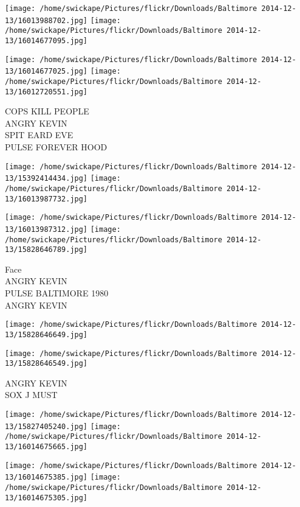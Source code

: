 \documentclass[10pt,letterpaper]{article}
\begin{document}
\texttt{[image: /home/swickape/Pictures/flickr/Downloads/Baltimore 2014-12-13/16013988702.jpg]}
\texttt{[image: /home/swickape/Pictures/flickr/Downloads/Baltimore 2014-12-13/16014677095.jpg]}

\texttt{[image: /home/swickape/Pictures/flickr/Downloads/Baltimore 2014-12-13/16014677025.jpg]}
\texttt{[image: /home/swickape/Pictures/flickr/Downloads/Baltimore 2014-12-13/16012720551.jpg]}

COPS KILL PEOPLE\\
ANGRY KEVIN\\
SPIT EARD EVE\\
PULSE FOREVER HOOD\\
\pagebreak

\texttt{[image: /home/swickape/Pictures/flickr/Downloads/Baltimore 2014-12-13/15392414434.jpg]}
\texttt{[image: /home/swickape/Pictures/flickr/Downloads/Baltimore 2014-12-13/16013987732.jpg]}

\texttt{[image: /home/swickape/Pictures/flickr/Downloads/Baltimore 2014-12-13/16013987312.jpg]}
\texttt{[image: /home/swickape/Pictures/flickr/Downloads/Baltimore 2014-12-13/15828646789.jpg]}

Face\\
ANGRY KEVIN\\
PULSE BALTIMORE 1980\\
ANGRY KEVIN\\
\pagebreak

\texttt{[image: /home/swickape/Pictures/flickr/Downloads/Baltimore 2014-12-13/15828646649.jpg]}

\vspace{0.25in}
\texttt{[image: /home/swickape/Pictures/flickr/Downloads/Baltimore 2014-12-13/15828646549.jpg]}

ANGRY KEVIN\\
SOX J MUST\\
\pagebreak

\texttt{[image: /home/swickape/Pictures/flickr/Downloads/Baltimore 2014-12-13/15827405240.jpg]}
\texttt{[image: /home/swickape/Pictures/flickr/Downloads/Baltimore 2014-12-13/16014675665.jpg]}

\texttt{[image: /home/swickape/Pictures/flickr/Downloads/Baltimore 2014-12-13/16014675385.jpg]}
\texttt{[image: /home/swickape/Pictures/flickr/Downloads/Baltimore 2014-12-13/16014675305.jpg]}
\end{document}
